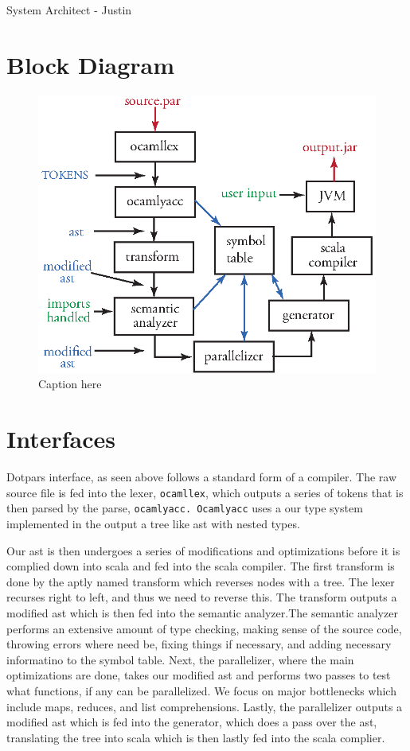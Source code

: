 System Architect - Justin

\section{Block Diagram}
\begin{figure}[H]
\centering
\includegraphics[scale=1]{blockdiagram.eps}
\caption{Caption here}
\end{figure}

\section{Interfaces}
Dotpars interface, as seen above follows a standard form of a
compiler. The raw source file is fed into the lexer, \verb=ocamllex=,
which outputs a series of tokens that is then parsed by the parse,
\verb=ocamlyacc. Ocamlyacc= uses a our type system implemented in the
output a tree like ast with nested types.

Our ast is then undergoes a series of modifications and optimizations
before it is complied down into scala and fed into the scala compiler.
The first transform is done by the aptly named transform which
reverses nodes with a tree.  The lexer recurses right to left, and
thus we need to reverse this.  The transform outputs a modified ast
which is then fed into the semantic analyzer.The semantic analyzer
performs an extensive amount of type checking, making sense of the
source code, throwing errors where need be, fixing things if
necessary, and adding necessary informatino to the symbol table.
Next, the parallelizer, where the main optimizations are done, takes
our modified ast and performs two passes to test what functions, if
any can be parallelized. We focus on major bottlenecks which include
maps, reduces, and list comprehensions. Lastly, the parallelizer
outputs a modified ast which is fed into the generator, which does a
pass over the ast, translating the tree into scala which is then
lastly fed into the scala complier.


